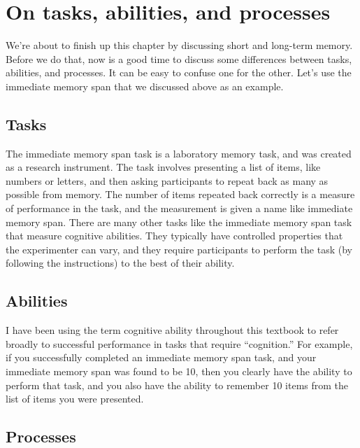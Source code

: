 \documentclass[
  oneside,
  12pt]{crumpbook}
\begin{document}
\hypertarget{on-tasks-abilities-and-processes}{%
\section{On tasks, abilities, and processes}\label{on-tasks-abilities-and-processes}}

We're about to finish up this chapter by discussing short and long-term memory. Before we do that, now is a good time to discuss some differences between tasks, abilities, and processes. It can be easy to confuse one for the other. Let's use the immediate memory span that we discussed above as an example.

\hypertarget{tasks}{%
\subsection{Tasks}\label{tasks}}

The immediate memory span task is a laboratory memory task, and was created as a research instrument. The task involves presenting a list of items, like numbers or letters, and then asking participants to repeat back as many as possible from memory. The number of items repeated back correctly is a measure of performance in the task, and the measurement is given a name like immediate memory span. There are many other tasks like the immediate memory span task that measure cognitive abilities. They typically have controlled properties that the experimenter can vary, and they require participants to perform the task (by following the instructions) to the best of their ability.

\hypertarget{abilities}{%
\subsection{Abilities}\label{abilities}}

I have been using the term cognitive ability throughout this textbook to refer broadly to successful performance in tasks that require ``cognition.'' For example, if you successfully completed an immediate memory span task, and your immediate memory span was found to be 10, then you clearly have the ability to perform that task, and you also have the ability to remember 10 items from the list of items you were presented.

\hypertarget{processes}{%
\subsection{Processes}\label{processes}}
\end{document}
